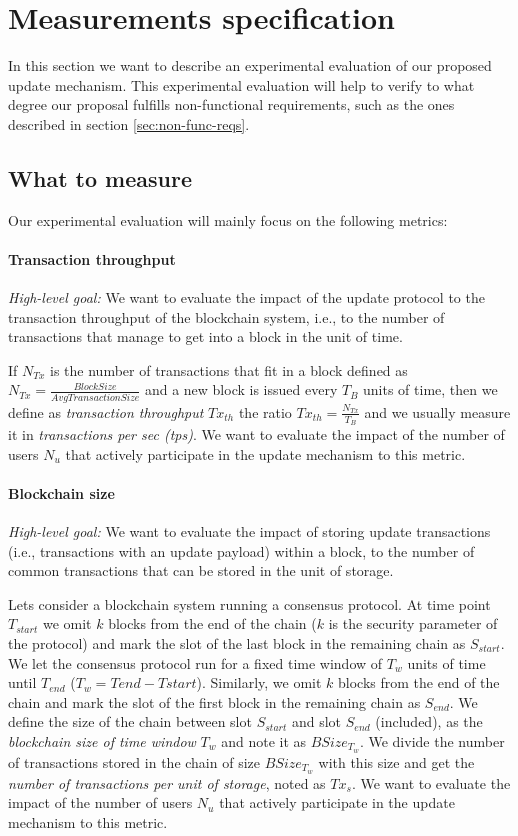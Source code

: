 \section{Measurements specification} \label{sec:measurements} In this section we
want to describe an experimental evaluation of our proposed update mechanism.
This experimental evaluation will help to verify to what degree our proposal
fulfills non-functional requirements, such as the ones described in section
\ref{sec:non-func-reqs}.

\subsection{What to measure} \label{sec:what-to-measure} Our experimental
evaluation will mainly focus on the following metrics:

\paragraph{Transaction throughput}
\emph{High-level goal:} We want to evaluate the impact of the update protocol to
the transaction throughput of the blockchain system, i.e., to the number of
transactions that manage to get into a block in the unit of time.

If $N_{Tx}$ is the number of transactions that fit in a block defined as
$N_{Tx} = \frac{Block Size}{Avg Transaction Size}$ and a new block is issued
every $T_B$ units of time, then we define as \emph{transaction throughput}
$Tx_{th}$ the ratio $Tx_{th} = \frac{N_{Tx}}{T_B}$ and we usually measure it in
\emph{transactions per sec (tps)}. We want to evaluate the impact of the number
of users $N_u$ that actively participate in the update mechanism to this metric.

\paragraph{Blockchain size}
\emph{High-level goal:} We want to evaluate the impact of storing update
transactions (i.e., transactions with an update payload) within a block, to the
number of common transactions that can be stored in the unit of storage.

Lets consider a blockchain system running a consensus protocol. At time point
$T_{start}$ we omit $k$ blocks from the end of the chain ($k$ is the security
parameter of the protocol) and mark the slot of the last block in the remaining
chain as $S_{start}$. We let the consensus protocol run for a fixed time window
of $T_w$ units of time until $T_{end}$ ($T_w = T{end} - T{start}$). Similarly,
we omit $k$ blocks from the end of the chain and mark the slot of the first
block in the remaining chain as $S_{end}$. We define the size of the chain
between slot $S_{start}$ and slot $S_{end}$ (included), as the \emph{blockchain
  size of time window} $T_w$ and note it as $BSize_{T_w}$. We divide the number
of transactions stored in the chain of size $BSize_{T_w}$ with this size and get
the \emph{number of transactions per unit of storage}, noted as $Tx_{s}$. We
want to evaluate the impact of the number of users $N_u$ that actively
participate in the update mechanism to this metric.

